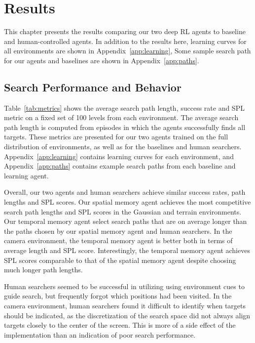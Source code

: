 \chapter{Results}
\label{cha:results}

This chapter presents the results comparing our two deep RL agents to baseline and human-controlled agents.
In addition to the results here, learning curves for all environments are shown in Appendix~\ref{app:learning},
Some sample search path for our agents and baselines are shown in Appendix~\ref{app:paths}.


\section{Search Performance and Behavior}

Table~\ref{tab:metrics} shows the average search path length, success rate and SPL metric on a fixed set of 100 levels from each environment.
The average search path length is computed from episodes in which the agents successfully finds all targets.
These metrics are presented for our two agents trained on the full distribution of environments, as well as for the baselines and human searchers.
Appendix~\ref{app:learning} contains learning curves for each environment, and Appendix~\ref{app:paths} contains example search paths from each baseline and learning agent. 

Overall, our two agents and human searchers achieve similar success rates, path lengths and SPL scores.
Our spatial memory agent achieves the most competitive search path lengths and SPL scores in the Gaussian and terrain environments.
Our temporal memory agent select search paths that are on average longer than the paths chosen by our spatial memory agent and human searchers.
In the camera environment, the temporal memory agent is better both in terms of average length and SPL score.
Interestingly, the temporal memory agent achieves SPL scores comparable to that of the spatial memory agent despite choosing much longer path lengths.

Human searchers seemed to be successful in utilizing using environment cues to guide search, but frequently forgot which positions had been visited.
In the camera environment, human searchers found it difficult to identify when targets should be indicated,
as the discretization of the search space did not always align targets closely to the center of the screen.
This is more of a side effect of the implementation than an indication of poor search performance.

